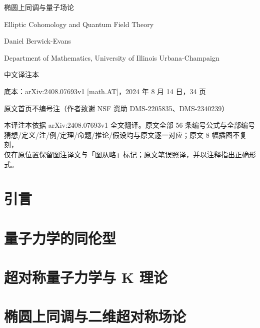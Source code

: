 \documentclass[UTF8,a4paper,11pt]{ctexart}
\begin{document}
\begin{titlepage}
\centering
\vspace*{3.2cm}
{\heiti{} 椭圆上同调与量子场论\par}
\vspace{1.2cm}
{\kaishu{} Elliptic Cohomology and Quantum Field Theory\par}
\vspace{2.2cm}
{ Daniel Berwick-Evans\par}
\vspace{0.6cm}
{ Department of Mathematics, University of Illinois Urbana-Champaign\par}
\vspace{2.4cm}
{\kaishu{} 中文译注本\par}
\vspace{0.8cm}
{ 底本：arXiv:2408.07693v1 [math.AT]，2024 年 8 月 14 日，34 页\par}
\vspace{0.5cm}
{ 原文首页不编号注（作者致谢 NSF 资助 DMS-2205835、DMS-2340239）\par}
\vfill
{\kaishu{}
本译注本依据 arXiv:2408.07693v1 全文翻译。原文全部 56 条编号公式与全部编号\\
猜想/定义/注/例/定理/命题/推论/假设均与原文逐一对应；原文 8 幅插图不复刻，\\
仅在原位置保留图注译文与「图从略」标记；原文笔误照译，并以注释指出正确形式。\par}
\vspace{1.0cm}
\end{titlepage}

\tableofcontents
\newpage



\clearpage
\section{引言}


\clearpage
\section{量子力学的同伦型}


\clearpage
\section{超对称量子力学与 K 理论}


\clearpage
\section{椭圆上同调与二维超对称场论}



\clearpage

\end{document}
